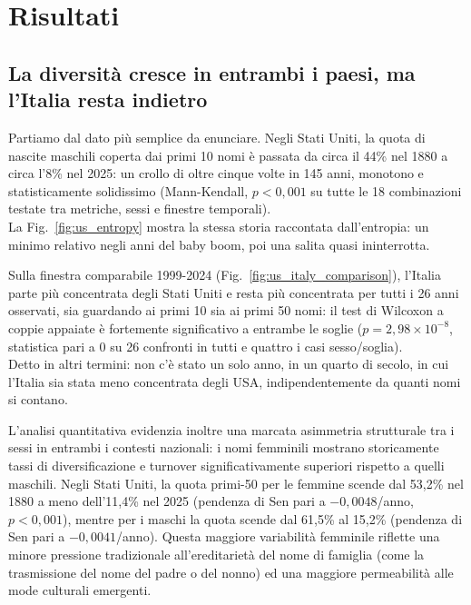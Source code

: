 \documentclass[conference]{IEEEtran}
\begin{document}
\section{Risultati}
\label{sec:risultati}

\subsection{La diversità cresce in entrambi i paesi, ma l'Italia resta indietro}

Partiamo dal dato più semplice da enunciare. Negli Stati Uniti, la quota di nascite maschili coperta
dai primi 10 nomi è passata da circa il 44\% nel 1880 a circa l'8\% nel 2025: un crollo di oltre
cinque volte in 145 anni, monotono e statisticamente solidissimo (Mann-Kendall, $p < 0{,}001$ su tutte
le 18 combinazioni testate tra metriche, sessi e finestre temporali). \\
La Fig.~\ref{fig:us_entropy}
mostra la stessa storia raccontata dall'entropia: un minimo relativo negli anni del baby boom, poi una
salita quasi ininterrotta.

Sulla finestra comparabile 1999-2024 (Fig.~\ref{fig:us_italy_comparison}), l'Italia parte più
concentrata degli Stati Uniti e resta più concentrata per tutti i 26 anni osservati, sia guardando ai
primi 10 sia ai primi 50 nomi: il test di Wilcoxon a coppie appaiate è fortemente significativo a
entrambe le soglie ($p = 2{,}98 \times 10^{-8}$, statistica pari a 0 su 26 confronti in tutti e
quattro i casi sesso/soglia). \\
Detto in altri termini: non c'è stato un solo anno, in un quarto di
secolo, in cui l'Italia sia stata meno concentrata degli USA, indipendentemente da quanti nomi si
contano.

L'analisi quantitativa evidenzia inoltre una marcata asimmetria strutturale tra i sessi in entrambi i 
contesti nazionali: i nomi femminili mostrano storicamente tassi di diversificazione e turnover 
significativamente superiori rispetto a quelli maschili. Negli Stati Uniti, la quota primi-50 per le 
femmine scende dal 53{,}2\% nel 1880 a meno dell'11{,}4\% nel 2025 (pendenza di Sen pari a $-0{,}0048$/anno, 
$p < 0{,}001$), mentre per i maschi la quota scende dal 61{,}5\% al 15{,}2\% (pendenza di Sen pari a 
$-0{,}0041$/anno). Questa maggiore variabilità femminile riflette una minore pressione tradizionale 
all'ereditarietà del nome di famiglia (come la trasmissione del nome del padre o del nonno) ed una maggiore 
permeabilità alle mode culturali emergenti.
\end{document}
